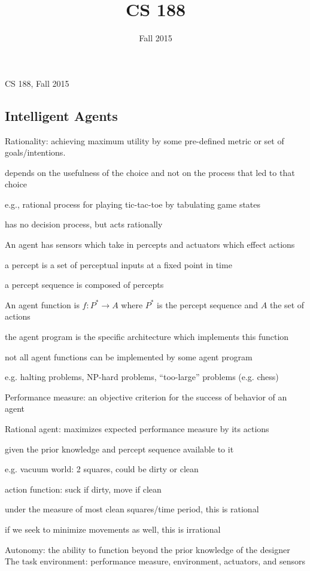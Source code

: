 \documentclass[12pt]{article}
\title{CS 188}
\date{\normalsize Fall 2015}
\begin{document}
\noindent
CS 188, Fall 2015\\

\subsection{Intelligent Agents}

\noindent
Rationality: achieving maximum utility by some pre-defined metric or set of goals/intentions.

depends on the usefulness of the choice and not on the process that led to that choice

e.g., rational process for playing tic-tac-toe by tabulating game states

has no decision process, but acts rationally

\noindent
An agent has sensors which take in percepts and actuators which effect actions

a percept is a set of perceptual inputs at a fixed point in time

a percept sequence is composed of percepts

\noindent
An agent function is $f: P^* \to A$ where $P^*$ is the percept sequence and $A$ the set of actions

the agent program is the specific architecture which implements this function

not all agent functions can be implemented by some agent program

e.g. halting problems, NP-hard problems, ``too-large'' problems (e.g. chess)

\noindent
Performance measure: an objective criterion for the success of behavior of an agent

\noindent
Rational agent: maximizes expected performance measure by its actions

given the prior knowledge and percept sequence available to it

e.g. vacuum world: 2 squares, could be dirty or clean

action function: suck if dirty, move if clean

under the measure of most clean squares/time period, this is rational

if we seek to minimize movements as well, this is irrational

\noindent
Autonomy: the ability to function beyond the prior knowledge of the designer\\

\noindent
The task environment: performance measure, environment, actuators, and sensors
\end{document}
